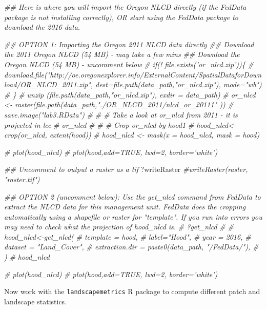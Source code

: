 \documentclass[
]{article}
\newenvironment{Shaded}{\begin{snugshade}}{\end{snugshade}}
\newcommand{\CommentTok}[1]{\textcolor[rgb]{0.56,0.35,0.01}{\textit{#1}}}
\newcommand{\NormalTok}[1]{#1}
\begin{document}
\begin{Shaded}
\begin{Highlighting}[]
\CommentTok{## Here is where you will import the Oregon NLCD directly (if the FedData package is not installing correctly), OR start using the FedData package to download the 2016 data.}

\CommentTok{## OPTION 1: Importing the Oregon 2011 NLCD data directly}
\CommentTok{## Download the 2011 Oregon NLCD (54 MB) - may take a few mins}
\CommentTok{## Download the Oregon NLCD (54 MB) - uncomment below}
\CommentTok{# if(! file.exists('or_nlcd.zip'))\{}
\CommentTok{# download.file("http://oe.oregonexplorer.info/ExternalContent/SpatialDataforDownload/OR_NLCD_2011.zip", dest=file.path(data_path,"or_nlcd.zip"), mode="wb")}
\CommentTok{# \}}
\CommentTok{# unzip (file.path(data_path,"or_nlcd.zip"), exdir = data_path)}
\CommentTok{# or_nlcd <- raster(file.path(data_path,"./OR_NLCD_2011/nlcd_or_20111" ))}
\CommentTok{# save.image("lab3.RData")}
\CommentTok{# }
\CommentTok{# # Take a look at or_nlcd from 2011 - it is projected in lcc}
\CommentTok{# or_nlcd}
\CommentTok{# }
\CommentTok{# # Crop or_nlcd by hood1}
\CommentTok{# hood_nlcd<-crop(or_nlcd, extent(hood))}
\CommentTok{# hood_nlcd <- mask(x = hood_nlcd, mask = hood)}

\CommentTok{# plot(hood_nlcd)}
\CommentTok{# plot(hood,add=TRUE, lwd=2, border='white')}

\CommentTok{## Uncomment to output a raster as a tif}
\NormalTok{?writeRaster}
\CommentTok{#writeRaster(raster, "raster.tif")}

\CommentTok{## OPTION 2 (uncomment below): Use the get_nlcd command from FedData to extract the NLCD data for this management unit. FedData does the cropping automatically using a shapefile or raster for "template". If you run into errors you may need to check what the projection of hood_nlcd is.}
\CommentTok{# ?get_nlcd}
\CommentTok{# }
\CommentTok{# hood_nlcd<-get_nlcd(}
\CommentTok{#   template = hood,}
\CommentTok{#   label="Hood",}
\CommentTok{#   year = 2016,}
\CommentTok{#   dataset = "Land_Cover",}
\CommentTok{#   extraction.dir = paste0(data_path, "/FedData/"),}
\CommentTok{# )}
\CommentTok{# hood_nlcd}

\CommentTok{# plot(hood_nlcd)}
\CommentTok{# plot(hood,add=TRUE, lwd=2, border='white')}
\end{Highlighting}
\end{Shaded}

Now work with the \texttt{landscapemetrics} R package to compute
different patch and landscape statistics.
\end{document}

